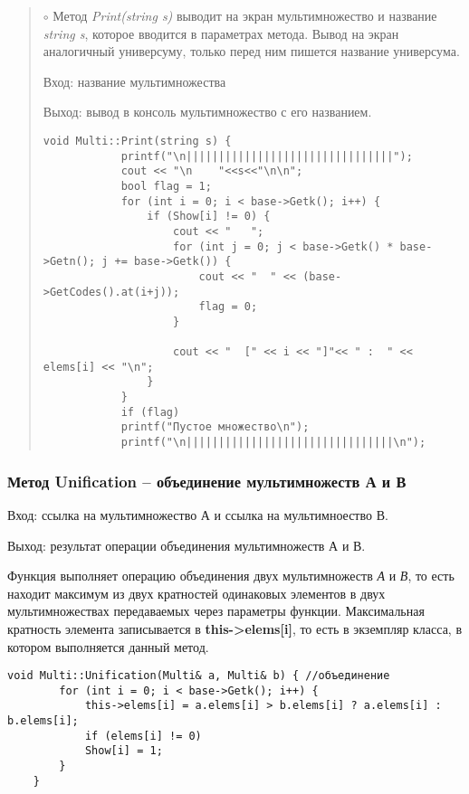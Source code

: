 \documentclass[10pt,a4paper,final]{article} %
\begin{document}
\begin{quote}
	
	$\circ$ Метод \textit{Print(string s)} выводит на экран мультимножество и название \textit{string s}, которое вводится в параметрах метода. Вывод на экран аналогичный универсуму, только перед ним пишется название универсума.
	\par Вход: название мультимножества
	\par Выход: вывод в консоль мультимножество с его названием.
	 
	\begin{lstlisting}[caption={Конструктор Print}]
		void Multi::Print(string s) {
			printf("\n||||||||||||||||||||||||||||||||");
			cout << "\n    "<<s<<"\n\n";
			bool flag = 1;
			for (int i = 0; i < base->Getk(); i++) {
				if (Show[i] != 0) {
					cout << "   ";
					for (int j = 0; j < base->Getk() * base->Getn(); j += base->Getk()) {
						cout << "  " << (base->GetCodes().at(i+j));
						flag = 0;
					}
					
					cout << "  [" << i << "]"<< " :  " << elems[i] << "\n";
				}
			}
			if (flag)
			printf("Пустое множество\n");
			printf("\n||||||||||||||||||||||||||||||||\n");
	\end{lstlisting}
	
\end{quote}

\subsubsection {Метод Unification -- объединение мультимножеств А и В}
\par Вход: ссылка на мультимножество А и ссылка на мультимноество В. 
\par Выход: результат операции объединения мультимножеств А и В.
\par Функция выполняет операцию объединения двух мультимножеств \textit{А} и \textit{В}, то есть находит максимум из двух кратностей одинаковых элементов в двух мультимножествах передаваемых через параметры функции. Максимальная кратность элемента записывается в \textbf{this->elems[i]}, то есть в экземпляр класса, в котором выполняется данный метод.

\begin{lstlisting}[caption={Метод Unification}]
	void Multi::Unification(Multi& a, Multi& b) { //объединение
		for (int i = 0; i < base->Getk(); i++) {
			this->elems[i] = a.elems[i] > b.elems[i] ? a.elems[i] : b.elems[i];
			if (elems[i] != 0)
			Show[i] = 1;
		}
	}
	\end{lstlisting}
	
\end{document}
